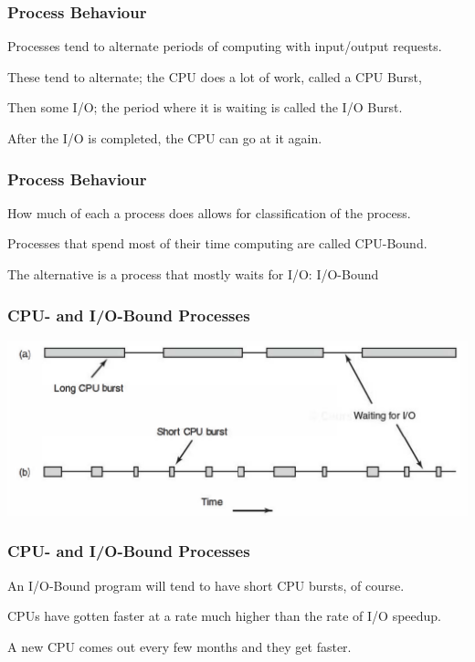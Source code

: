\begin{frame}
\frametitle{Process Behaviour}

Processes tend to alternate periods of computing with input/output requests. 

These tend to alternate; the CPU does a lot of work, called a \alert{CPU Burst},

Then some I/O; the period where it is waiting is called the \alert{I/O Burst}. 

After the I/O is completed, the CPU can go at it again. 

\end{frame}

\begin{frame}
\frametitle{Process Behaviour}

How much of each a process does allows for classification of the process.

Processes that spend most of their time computing are called \alert{CPU-Bound}.

The alternative is a process that mostly waits for I/O: \alert{I/O-Bound}


\end{frame}

\begin{frame}
\frametitle{CPU- and I/O-Bound Processes}

\begin{center}
\includegraphics[width=\textwidth]{images/cpu-io-bound.png}
\end{center}


\end{frame}

\begin{frame}
\frametitle{CPU- and I/O-Bound Processes}

An I/O-Bound program will tend to have short CPU bursts, of course. 

CPUs have gotten faster at a rate much higher than the rate of I/O speedup. 

A new CPU comes out every few months and they get faster. 

\end{frame}

